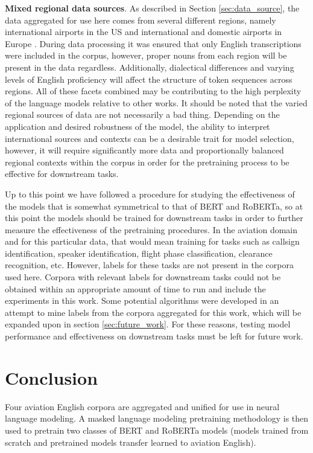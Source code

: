 \documentclass[12pt]{article}
\begin{document}
\textbf{Mixed regional data sources}. As described in Section \ref{sec:data_source}, the data aggregated for use here comes from several different
regions, namely international airports in the US \cite{godfrey_air_1994} and international and domestic airports in Europe
\cite{smidl_air_2019,hofbauer_atcosim_2008,szoke_detecting_2021}. During data processing it was ensured that only English transcriptions were included
in the corpus, however, proper nouns from each region will be present in the data regardless. Additionally, dialectical differences and varying levels
of English proficiency will affect the structure of token sequences across regions. All of these facets combined may be contributing to the high
perplexity of the language models relative to other works. It should be noted that the varied regional sources of data are not necessarily a bad
thing. Depending on the application and desired robustness of the model, the ability to interpret international sources and contexts can be a
desirable trait for model selection, however, it will require significantly more data and proportionally balanced regional contexts within the corpus
in order for the pretraining process to be effective for downstream tasks.

Up to this point we have followed a procedure for studying the effectiveness of the models that is somewhat symmetrical to that of BERT and RoBERTa,
so at this point the models should be trained for downstream tasks in order to further measure the effectiveness of the pretraining procedures.
In the aviation domain and for this particular data, that would mean training for tasks such as callsign identification, speaker identification,
flight phase classification, clearance recognition, etc. However, labels for these tasks are not present in the corpora used here. Corpora with
relevant labels for downstream tasks could not be obtained within an appropriate amount of time to run and include the experiments in this work.
Some potential algorithms were developed in an attempt to mine labels from the corpora aggregated for this work, which will be expanded upon in
section \ref{sec:future_work}. For these reasons, testing model performance and effectiveness on downstream tasks must be left for future work.

\section{Conclusion}\label{sec:conclusion}
Four aviation English corpora are aggregated and unified for use in neural language modeling. A masked language modeling pretraining methodology is
then used to pretrain two classes of BERT and RoBERTa models (models trained from scratch and pretrained models transfer learned to aviation English).
\end{document}
